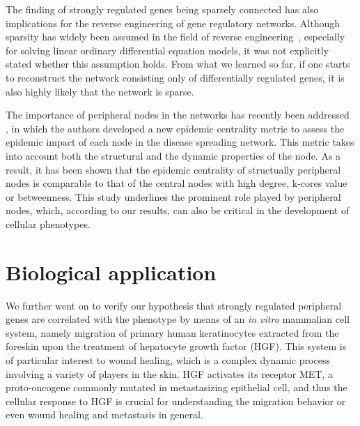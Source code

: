 The finding of strongly regulated genes being sparsely connected
has also implications for the reverse engineering of gene regulatory
networks. Although sparsity has widely been assumed in the field
of reverse engineering~\citep{Yeung2002,Gardner2003}, especially
for solving linear ordinary differential equation models, it was
not explicitly stated whether this assumption holds. From what
we learned so far, if one starts to reconstruct the network consisting only of
differentially regulated genes, it is also highly likely that
the network is sparse.

The importance of peripheral nodes in the networks has recently been addressed~%
\citep{Sikic2011}, in which the authors developed a new epidemic centrality
metric to assess the epidemic impact of each node in the disease spreading
network. This metric takes into account both the structural and 
the dynamic properties of the node. As a result,
it has been shown that the epidemic centrality of structually peripheral nodes is 
comparable to that of the central nodes with high degree, k-cores value or 
betweenness. This study underlines the prominent role played by peripheral
nodes, which, according to our results, can also be critical in the 
development of cellular phenotypes.

\section{Biological application}
We further went on to verify our hypothesis that strongly regulated peripheral 
genes are correlated with the phenotype by means of an \emph{in vitro}
mammalian cell system, namely migration of primary human keratinocytes extracted from the foreskin
upon the treatment of hepatocyte growth factor (HGF). 
This system is of particular interest to wound healing, which is a complex 
dynamic process involving a variety of players in the skin.
HGF activates its receptor MET, a proto-oncogene commonly mutated in 
metastasizing epithelial cell, and thus the cellular response to HGF is 
crucial for understanding the migration behavior or even wound healing and 
metastasis in general. 

